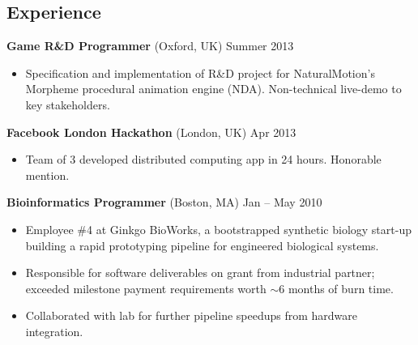 \documentclass[margin]{res}
\newcommand{\locdatesubsection}[3]{\textbf{#1} (#2) \hfill #3}
\begin{document}
\begin{sloppypar}
\begin{resume}
\section{Experience}
\locdatesubsection{Game R\&D Programmer}{Oxford, UK}{Summer 2013}
\begin{itemize}
    \item Specification and implementation of R\&D project for NaturalMotion's Morpheme procedural animation engine (NDA). Non-technical live-demo to key stakeholders.
\end{itemize}

\locdatesubsection{Facebook London Hackathon}{London, UK}{Apr 2013}
    \begin{itemize}
        \item Team of 3 developed distributed computing app in 24 hours. Honorable mention.
    \end{itemize}

\locdatesubsection{Bioinformatics Programmer}{Boston, MA}{Jan -- May 2010}
\begin{itemize}
    \item Employee \#4 at Ginkgo BioWorks, a bootstrapped synthetic biology start-up building a rapid prototyping pipeline for engineered biological systems. 
    \item Responsible for software deliverables on grant from industrial partner; exceeded milestone payment requirements worth $\sim$6 months of burn time.
    \item Collaborated with lab for further pipeline speedups from hardware integration.
\end{itemize}


\end{resume}
\end{sloppypar}
\end{document}
